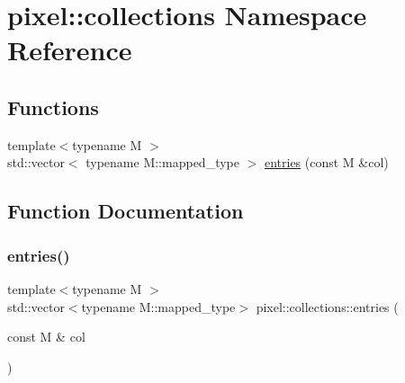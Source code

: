 \hypertarget{namespacepixel_1_1collections}{}\section{pixel\+:\+:collections Namespace Reference}
\label{namespacepixel_1_1collections}
\subsection*{Functions}
\begin{DoxyCompactItemize}
\item 
{\footnotesize template$<$typename M $>$ }\\std\+::vector$<$ typename M\+::mapped\+\_\+type $>$ \hyperlink{namespacepixel_1_1collections_ac0147e9bd20956e2684c12fd37a43811}{entries} (const M \&col)
\end{DoxyCompactItemize}


\subsection{Function Documentation}
\mbox{\label{namespacepixel_1_1collections_ac0147e9bd20956e2684c12fd37a43811}} 
\subsubsection{\texorpdfstring{entries()}{entries()}}
{\footnotesize\ttfamily template$<$typename M $>$ \\
std\+::vector$<$typename M\+::mapped\+\_\+type$>$ pixel\+::collections\+::entries (\begin{DoxyParamCaption}\item[{const M \&}]{col }\end{DoxyParamCaption})}

